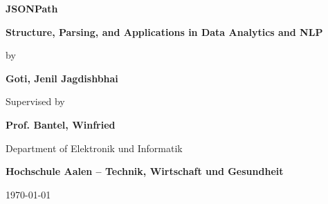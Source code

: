 \begin{titlepage}
	\centering
	\vspace*{3cm}
	{\Huge \bfseries JSONPath \par}
	{\Large \textbf{Structure, Parsing, and Applications in Data Analytics and NLP} \par}
	\vspace{2cm}
	{\Large by \par}
	\vspace{0.5cm}
	{\Large \textbf{Goti, Jenil Jagdishbhai} \par}		
	\vspace{0.5cm}
	{\large Supervised by \par}
	{\Large \textbf{Prof. Bantel, Winfried} \par} 
	\vfill
	{\large Department of Elektronik und Informatik \par}
	{\large \textbf{Hochschule Aalen – Technik, Wirtschaft und Gesundheit} \par}
	{\large \today \par}
\end{titlepage}
